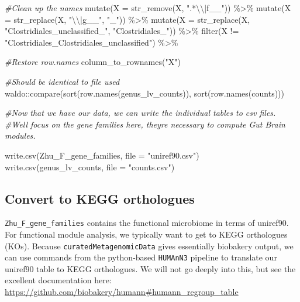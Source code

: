\documentclass[
]{article}
\newenvironment{Shaded}{\begin{snugshade}}{\end{snugshade}}
\newcommand{\AttributeTok}[1]{\textcolor[rgb]{0.77,0.63,0.00}{#1}}
\newcommand{\CommentTok}[1]{\textcolor[rgb]{0.56,0.35,0.01}{\textit{#1}}}
\newcommand{\FunctionTok}[1]{\textcolor[rgb]{0.00,0.00,0.00}{#1}}
\newcommand{\NormalTok}[1]{#1}
\newcommand{\SpecialCharTok}[1]{\textcolor[rgb]{0.00,0.00,0.00}{#1}}
\newcommand{\StringTok}[1]{\textcolor[rgb]{0.31,0.60,0.02}{#1}}
\begin{document}
\begin{Shaded}
\begin{Highlighting}[]
  \CommentTok{\#Clean up the names}
  \FunctionTok{mutate}\NormalTok{(}\AttributeTok{X =} \FunctionTok{str\_remove}\NormalTok{(X, }\StringTok{".*}\SpecialCharTok{\textbackslash{}\textbackslash{}}\StringTok{|f\_\_"}\NormalTok{)) }\SpecialCharTok{\%\textgreater{}\%} 
  \FunctionTok{mutate}\NormalTok{(}\AttributeTok{X =} \FunctionTok{str\_replace}\NormalTok{(X, }\StringTok{"}\SpecialCharTok{\textbackslash{}\textbackslash{}}\StringTok{|g\_\_"}\NormalTok{, }\StringTok{"\_"}\NormalTok{)) }\SpecialCharTok{\%\textgreater{}\%} 
  \FunctionTok{mutate}\NormalTok{(}\AttributeTok{X =} \FunctionTok{str\_replace}\NormalTok{(X, }\StringTok{"Clostridiales\_unclassified\_"}\NormalTok{, }\StringTok{"Clostridiales\_"}\NormalTok{)) }\SpecialCharTok{\%\textgreater{}\%} 
  \FunctionTok{filter}\NormalTok{(X }\SpecialCharTok{!=} \StringTok{"Clostridiales\_Clostridiales\_unclassified"}\NormalTok{) }\SpecialCharTok{\%\textgreater{}\%} 
  
  \CommentTok{\#Restore row.names}
  \FunctionTok{column\_to\_rownames}\NormalTok{(}\StringTok{"X"}\NormalTok{)}

\CommentTok{\#Should be identical to file used}
\NormalTok{waldo}\SpecialCharTok{::}\FunctionTok{compare}\NormalTok{(}\FunctionTok{sort}\NormalTok{(}\FunctionTok{row.names}\NormalTok{(genus\_lv\_counts)), }\FunctionTok{sort}\NormalTok{(}\FunctionTok{row.names}\NormalTok{(counts)))}

\CommentTok{\#Now that we have our data, we can write the individual tables to csv files. }
\CommentTok{\#We\textquotesingle{}ll focus on the gene families here, they\textquotesingle{}re necessary to compute Gut Brain modules.}

\FunctionTok{write.csv}\NormalTok{(Zhu\_F\_gene\_families, }\AttributeTok{file =} \StringTok{"uniref90.csv"}\NormalTok{)}
\FunctionTok{write.csv}\NormalTok{(genus\_lv\_counts,     }\AttributeTok{file =} \StringTok{"counts.csv"}\NormalTok{)}
\end{Highlighting}
\end{Shaded}

\hypertarget{convert-to-kegg-orthologues}{%
\subsection{Convert to KEGG
orthologues}\label{convert-to-kegg-orthologues}}

\texttt{Zhu\_F\_gene\_families} contains the functional microbiome in
terms of uniref90. For functional module analysis, we typically want to
get to KEGG orthologues (KOs). Because \texttt{curatedMetagenomicData}
gives essentially biobakery output, we can use commands from the
python-based \texttt{HUMAnN3} pipeline to translate our uniref90 table
to KEGG orthologues. We will not go deeply into this, but see the
excellent documentation here:
\url{https://github.com/biobakery/humann\#humann_regroup_table}
\end{document}
